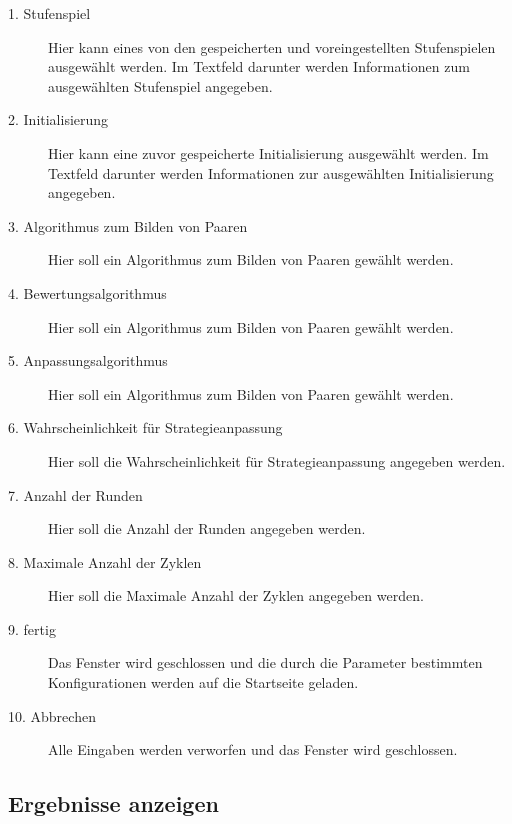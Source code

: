 \begin{description}

\item[1. Stufenspiel] Hier kann eines von den gespeicherten und voreingestellten Stufenspielen ausgewählt werden. Im Textfeld darunter werden Informationen zum ausgewählten Stufenspiel angegeben.

\item[2. Initialisierung] Hier kann eine zuvor gespeicherte Initialisierung ausgewählt werden. Im Textfeld darunter werden Informationen zur ausgewählten Initialisierung angegeben.

\item[3. Algorithmus zum Bilden von Paaren] Hier soll ein Algorithmus zum Bilden von Paaren gewählt werden. 

\item[4. Bewertungsalgorithmus] Hier soll ein Algorithmus zum Bilden von Paaren gewählt werden.

\item[5. Anpassungsalgorithmus] Hier soll ein Algorithmus zum Bilden von Paaren gewählt werden.

\item[6. Wahrscheinlichkeit für Strategieanpassung] Hier soll die Wahrscheinlichkeit für Strategieanpassung angegeben werden.

\item[7. Anzahl der Runden] Hier soll die Anzahl der Runden angegeben werden.

\item[8. Maximale Anzahl der Zyklen] Hier soll die Maximale Anzahl der Zyklen angegeben werden.

\item[9. fertig] Das Fenster wird geschlossen und die durch die Parameter bestimmten Konfigurationen werden auf die Startseite geladen.

\item[10. Abbrechen] Alle Eingaben werden verworfen und das Fenster wird geschlossen.


\end{description}

\pagebreak


\subsection{Ergebnisse anzeigen}

